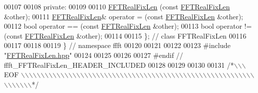 \begin{DoxyCode}
00107 
00108 \textcolor{keyword}{private}:
00109 
00110                         \hyperlink{a00011_ac94c40796b1e5211383357a65738319d}{FFTRealFixLen} (\textcolor{keyword}{const} \hyperlink{a00011_ac94c40796b1e5211383357a65738319d}{FFTRealFixLen} &other);
00111     \hyperlink{a00011_ac94c40796b1e5211383357a65738319d}{FFTRealFixLen}& operator = (\textcolor{keyword}{const} \hyperlink{a00011_ac94c40796b1e5211383357a65738319d}{FFTRealFixLen} &other);
00112     \textcolor{keywordtype}{bool}                operator == (\textcolor{keyword}{const} \hyperlink{a00011_ac94c40796b1e5211383357a65738319d}{FFTRealFixLen} &other);
00113     \textcolor{keywordtype}{bool}                operator != (\textcolor{keyword}{const} \hyperlink{a00011_ac94c40796b1e5211383357a65738319d}{FFTRealFixLen} &other);
00114 
00115 \};  \textcolor{comment}{// class FFTRealFixLen}
00116 
00117 
00118 
00119 \}   \textcolor{comment}{// namespace ffft}
00120 
00121 
00122 
00123 \textcolor{preprocessor}{#include    "\hyperlink{a00098}{FFTRealFixLen.hpp}"}
00124 
00125 
00126 
00127 \textcolor{preprocessor}{#endif  // ffft\_FFTRealFixLen\_HEADER\_INCLUDED}
00128 
00129 
00130 
00131 \textcolor{comment}{/*\(\backslash\)\(\backslash\)\(\backslash\) EOF \(\backslash\)\(\backslash\)\(\backslash\)\(\backslash\)\(\backslash\)\(\backslash\)\(\backslash\)\(\backslash\)\(\backslash\)\(\backslash\)\(\backslash\)\(\backslash\)\(\backslash\)\(\backslash\)\(\backslash\)\(\backslash\)\(\backslash\)\(\backslash\)\(\backslash\)\(\backslash\)\(\backslash\)\(\backslash\)\(\backslash\)\(\backslash\)\(\backslash\)\(\backslash\)\(\backslash\)\(\backslash\)\(\backslash\)\(\backslash\)\(\backslash\)\(\backslash\)\(\backslash\)\(\backslash\)\(\backslash\)\(\backslash\)\(\backslash\)\(\backslash\)\(\backslash\)\(\backslash\)\(\backslash\)\(\backslash\)\(\backslash\)\(\backslash\)\(\backslash\)\(\backslash\)\(\backslash\)\(\backslash\)\(\backslash\)\(\backslash\)\(\backslash\)\(\backslash\)\(\backslash\)\(\backslash\)\(\backslash\)\(\backslash\)\(\backslash\)\(\backslash\)\(\backslash\)\(\backslash\)\(\backslash\)\(\backslash\)\(\backslash\)\(\backslash\)\(\backslash\)\(\backslash\)*/}
\end{DoxyCode}
